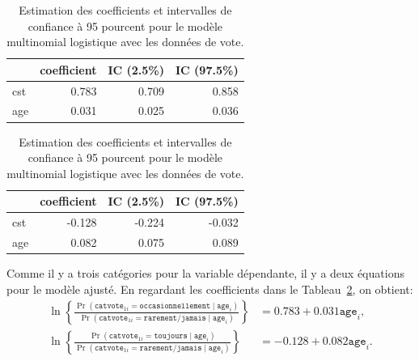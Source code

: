 \documentclass[
  11pt,
  letterpaper,
]{book}
\theoremstyle{definition}
\theoremstyle{remark}
\begin{document}
\begin{table}

\caption{\label{tbl-multinom-coefs}Estimation des coefficients et
intervalles de confiance à 95 pourcent pour le modèle multinomial
logistique avec les données de vote.}\begin{minipage}[t]{\linewidth}

{\centering 

\centering
\begin{tabular}[t]{lrrr}
\toprule
  & coefficient & IC (2.5\%) & IC (97.5\%)\\
\midrule
cst & 0.783 & 0.709 & 0.858\\
age & 0.031 & 0.025 & 0.036\\
\bottomrule
\end{tabular}

}

\end{minipage}%
\newline
\begin{minipage}[t]{\linewidth}

{\centering 

\centering
\begin{tabular}[t]{lrrr}
\toprule
  & coefficient & IC (2.5\%) & IC (97.5\%)\\
\midrule
cst & -0.128 & -0.224 & -0.032\\
age & 0.082 & 0.075 & 0.089\\
\bottomrule
\end{tabular}

}

\end{minipage}%

\end{table}

Comme il y a trois catégories pour la variable dépendante, il y a deux
équations pour le modèle ajusté. En regardant les coefficients dans le
Tableau~\ref{tbl-multinom-coefs}, on obtient: \begin{align*}
\ln \left\{\frac{\Pr(\texttt{catvote}_{1i}= \texttt{occasionnellement}\mid \texttt{age}_i)}{\Pr(\texttt{catvote}_{1i} = \texttt{rarement/jamais} \mid \texttt{age}_i)} \right\} &=
0.783 + 
0.031 \texttt{age}_i, \\ 
\ln \left\{\frac{\Pr(\texttt{catvote}_{1i}= \texttt{toujours}\mid \texttt{age}_i)}{\Pr(\texttt{catvote}_{1i}= \texttt{rarement/jamais}  \mid \texttt{age}_i)} \right\} &= 
-0.128 + 0.082\texttt{age}_i. 
\end{align*}
\end{document}
